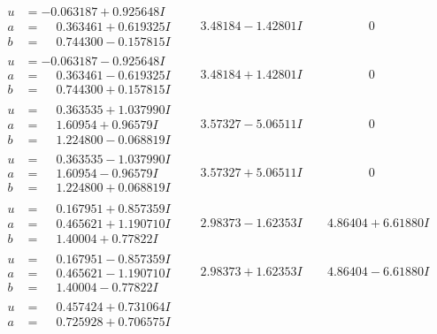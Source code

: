 \documentclass[1p]{elsarticle_modified}
\theoremstyle{definition}
\begin{document}
$$\begin{array}{c|c|c}
\begin{aligned}
u &= -0.063187 + 0.925648 I \\
a &= \phantom{-}0.363461 + 0.619325 I \\
b &= \phantom{-}0.744300 - 0.157815 I\end{aligned}
 & \phantom{-}3.48184 - 1.42801 I & \phantom{-0.000000 } 0 \\ \hline\begin{aligned}
u &= -0.063187 - 0.925648 I \\
a &= \phantom{-}0.363461 - 0.619325 I \\
b &= \phantom{-}0.744300 + 0.157815 I\end{aligned}
 & \phantom{-}3.48184 + 1.42801 I & \phantom{-0.000000 } 0 \\ \hline\begin{aligned}
u &= \phantom{-}0.363535 + 1.037990 I \\
a &= \phantom{-}1.60954 + 0.96579 I \\
b &= \phantom{-}1.224800 - 0.068819 I\end{aligned}
 & \phantom{-}3.57327 - 5.06511 I & \phantom{-0.000000 } 0 \\ \hline\begin{aligned}
u &= \phantom{-}0.363535 - 1.037990 I \\
a &= \phantom{-}1.60954 - 0.96579 I \\
b &= \phantom{-}1.224800 + 0.068819 I\end{aligned}
 & \phantom{-}3.57327 + 5.06511 I & \phantom{-0.000000 } 0 \\ \hline\begin{aligned}
u &= \phantom{-}0.167951 + 0.857359 I \\
a &= \phantom{-}0.465621 + 1.190710 I \\
b &= \phantom{-}1.40004 + 0.77822 I\end{aligned}
 & \phantom{-}2.98373 - 1.62353 I & \phantom{-}4.86404 + 6.61880 I \\ \hline\begin{aligned}
u &= \phantom{-}0.167951 - 0.857359 I \\
a &= \phantom{-}0.465621 - 1.190710 I \\
b &= \phantom{-}1.40004 - 0.77822 I\end{aligned}
 & \phantom{-}2.98373 + 1.62353 I & \phantom{-}4.86404 - 6.61880 I \\ \hline\begin{aligned}
u &= \phantom{-}0.457424 + 0.731064 I \\
a &= \phantom{-}0.725928 + 0.706575 I \\

\end{aligned}
\end{array}$$
\end{document}
